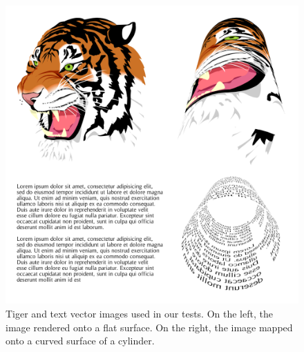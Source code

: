 \documentclass[11pt,a4paper,twoside]{article}
\begin{document}
\begin {figure}
	\centering
	\includegraphics[width=1.0\columnwidth] {figures/render_all}
	\caption {Tiger and text vector images used in our tests. On the left, the image rendered onto a flat surface. On the right, the image mapped onto a curved surface of a cylinder.}
	\label {fig:screenshots}
\end {figure}

\newpage


\end{document}

